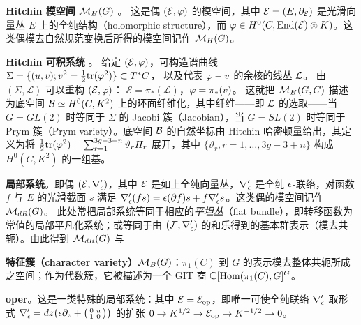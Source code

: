 {\bf Hitchin 模空间 $\mathcal{M}_H(G)$} \cite{Hi87}。
这是偶 $(\mathcal{E},\varphi)$ 的模空间，其中 $\mathcal{E}=(E,\bar{\partial}_{\mathcal{E}})$ 是光滑向量丛 $E$ 上的全纯结构（holomorphic structure），而 $\varphi\in H^0(C,\mathrm{End}(\mathcal{E})\otimes K)$。这类偶模去自然规范变换后所得的模空间记作 $\mathcal{M}_H(G)$。

{\bf Hitchin 可积系统} \cite{Hi87}。
给定 $(\mathcal{E},\varphi)$，可构造谱曲线
$\Sigma=\{(u,v);v^2=\frac{1}{2}\mathrm{tr}(\varphi^2)\}\subset T^*C$，
以及代表 $\varphi-v$ 的余核的线丛 $\mathcal{L}$。
由 $(\Sigma, \mathcal{L})$ 可以重构 $(\mathcal{E},\varphi)$：
$\mathcal{E}=\pi_*(\mathcal{L})$，$\varphi=\pi_*(v)$。
这就把 $\mathcal{M}_{H}(G,C)$ 描述为底空间
$\mathcal{B}\simeq H^0(C,K^2)$
上的环面纤维化，其中纤维——即 $\mathcal{L}$ 的选取——当 $G=GL(2)$ 时等同于 $\Sigma$ 的 Jacobi 簇（Jacobian），当 $G=SL(2)$ 时等同于 Prym 簇（Prym variety）。底空间 $\mathcal{B}$ 的自然坐标由 Hitchin 哈密顿量给出，其定义为将
$\frac{1}{2}\mathrm{tr}(\varphi^2)=\sum_{r=1}^{3g-3+n}\vartheta_rH_r$
展开，其中 $\{\vartheta_r, r=1,\dots,3g-3+n\}$ 构成 $H^0(C,K^2)$ 的一组基。

{\bf 局部系统}。即偶 $(\mathcal{E},\nabla_\epsilon')$，其中 $\mathcal{E}$ 是如上全纯向量丛，$\nabla_\epsilon'$ 是全纯 $\epsilon$-联络，对函数 $f$ 与 $E$ 的光滑截面 $s$ 满足
$\nabla_\epsilon' (fs)=\epsilon (\partial f)s+f\nabla_\epsilon's$。这类偶的模空间记作 $\mathcal{M}_{dR}(G)$。
此处常把局部系统等同于相应的\emph{平坦丛}（flat bundle），即转移函数为常值的局部平凡化系统；或等同于由 $(\mathcal{F},\nabla_\epsilon')$ 的和乐得到的基本群表示（模去共轭）。由此得到 $\mathcal{M}_{dR}(G)$ 与

{\bf 特征簇（character variety）$\mathcal{M}_B(G)$}：$\pi_1(C)$ 到 $G$ 的表示模去整体共轭所成之空间；作为代数簇，它被描述为一个 GIT 商
$\mathbb{C}[\mathrm{Hom}(\pi_1(C),G]^G$。

{\bf oper}。这是一类特殊的局部系统：其中 $\mathcal{E}=\mathcal{E}_{\rm op}$，即唯一可使全纯联络 $\nabla_\epsilon'$ 取形式
$\nabla_\epsilon'=dz\big(\epsilon\partial_z+\big(
\begin{smallmatrix} 0 & u \\ 1 & 0\end{smallmatrix}\big)\big)$
的扩张
$0\to K^{1/2}\to\mathcal{E}_{\rm op} \to K^{-1/2}\to 0$。

